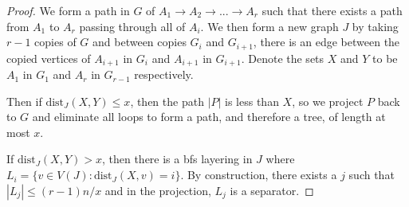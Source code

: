 \documentclass[]{article}
\theoremstyle{definition}
\numberwithin{theorem}{section}
\numberwithin{equation}{section}
\begin{document}
\begin{proof}
	\newcommand{\dist}{\text{dist}}
	We form a path in $G$ of $A_1 \rightarrow A_2 \rightarrow ... \rightarrow A_r$ such that there exists a path from $A_1$ to $A_r$ passing through all of $A_i$. We then form a new graph $J$ by taking $r-1$ copies of $G$ and between copies $G_i$ and $G_{i+1}$, there is an edge between the copied vertices of $A_{i+1}$ in $G_i$ and $A_{i+1}$ in $G_{i+1}$. Denote the sets $X$ and $Y$ to be $A_1$ in $G_1$ and $A_r$ in $G_{r-1}$ respectively. 
	\par
	Then if $ \dist_J(X, Y) \leq x$, then the path $|P|$ is less than $X$, so we project $P$ back to $G$ and eliminate all loops to form a path, and therefore a tree, of length at most $x$. 
	\par
	If $ \dist_J(X, Y) > x$, then there is a bfs layering in $J$ where $L_i =  \lbrace v \in V(J) : \dist_J(X, v) = i \rbrace$. By construction, there exists a $j$ such that $|L_j| \leq (r-1)n/x$ and in the projection, $L_j$ is a separator. 
\end{proof}
\end{document}
